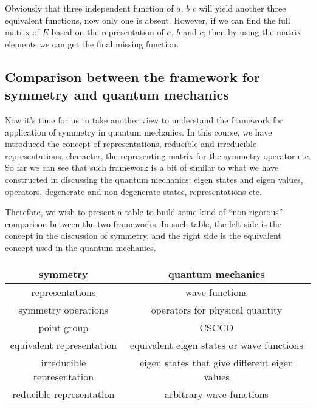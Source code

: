 Obviously that three independent function of $a$, $b$ $c$ will yield
another three equivalent functions, now only one is absent. However,
if we can find the full matrix of $E$ based on the representation of
$a$, $b$ and $c$; then by using the matrix elements we can get the
final missing function.

\subsection{Comparison between the framework for symmetry and quantum
  mechanics}\label{GROUP14}
%
%
%
Now it's time for us to take another view to understand the framework
for application of symmetry in quantum mechanics. In this course, we
have introduced the concept of representations, reducible and
irreducible representations, character, the representing matrix for
the symmetry operator etc. So far we can see that such framework is a
bit of similar to what we have constructed in discussing the quantum
mechanics: eigen states and eigen values, operators, degenerate and
non-degenerate states, representations etc.

Therefore, we wish to present a table to build some kind of
``non-rigorous'' comparison between the two frameworks. In such table,
the left side is the concept in the discussion of symmetry, and the
right side is the equivalent concept used in the quantum mechanics.
\begin{center}
  \begin{tabular}{c|c}
    \hline
    symmetry  & quantum mechanics \\
    \hline
    representations & wave functions \\
    symmetry operations & operators for physical quantity \\
    point group & CSCCO \\
    equivalent representation & equivalent eigen states or wave functions \\
    irreducible representation &  eigen states that give
    different eigen values \\
    reducible representation &  arbitrary wave functions\\
    \hline
  \end{tabular}
\end{center}

